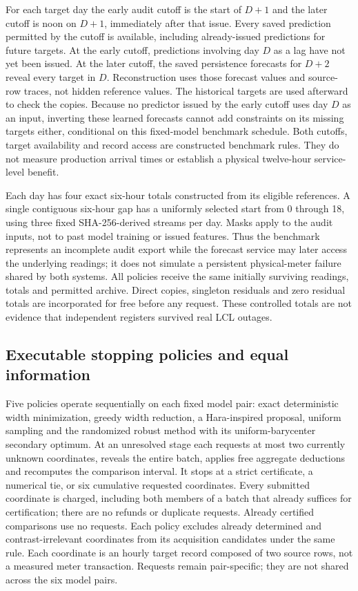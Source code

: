 \documentclass[12pt]{article}
\begin{document}
For each target day the early audit cutoff is the start of $D+1$ and the
later cutoff is noon on $D+1$, immediately after that issue. Every saved
prediction permitted by the cutoff is available, including already-issued
predictions for future targets. At the early cutoff, predictions involving
day $D$ as a lag have not yet been issued. At the later cutoff, the saved
persistence forecasts for $D+2$ reveal every target in $D$. Reconstruction
uses those forecast values and source-row traces, not hidden reference
values. The historical targets are used afterward to check the copies.
Because no predictor issued by the early cutoff uses day $D$ as an input,
inverting these learned forecasts cannot add constraints on its missing
targets either, conditional on this fixed-model benchmark schedule.
Both cutoffs, target availability and record access are constructed
benchmark rules. They do not measure production arrival times or establish
a physical twelve-hour service-level benefit.

Each day has four exact six-hour totals constructed from its eligible
references. A single contiguous six-hour gap has a uniformly selected start
from 0 through 18, using three fixed SHA-256-derived streams per day. Masks
apply to the audit inputs, not to past model training or issued features.
Thus the benchmark represents an incomplete audit export while the forecast
service may later access the underlying readings; it does not simulate a
persistent physical-meter failure shared by both systems.
All policies receive the same initially surviving readings, totals and
permitted archive. Direct copies, singleton residuals and zero residual
totals are incorporated for free before any request. These controlled totals
are not evidence that independent registers survived real LCL outages.

\subsection{Executable stopping policies and equal information}\label{sec:external-policies}
Five policies operate sequentially on each fixed model pair: exact
deterministic width minimization, greedy width reduction, a Hara-inspired
proposal, uniform sampling and the randomized robust method with its
uniform-barycenter secondary optimum. At an unresolved stage each requests
at most two currently unknown coordinates, reveals the entire batch, applies
free aggregate deductions and recomputes the comparison interval. It stops
at a strict certificate, a numerical tie, or six cumulative requested
coordinates. Every submitted coordinate is charged, including both members
of a batch that already suffices for certification; there are no refunds or
duplicate requests. Already certified comparisons use no requests. Each
policy excludes already determined and contrast-irrelevant coordinates
from its acquisition candidates under the same rule. Each
coordinate is an hourly target record composed of two source rows, not a
measured meter transaction. Requests remain pair-specific; they are not
shared across the six model pairs.
\end{document}

